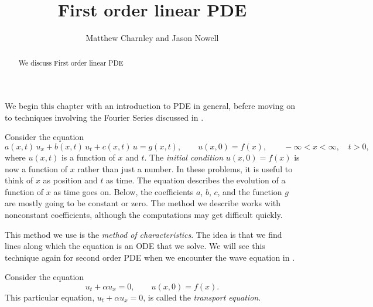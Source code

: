 \documentclass{ximera}
\title{First order linear PDE}
\author{Matthew Charnley and Jason Nowell}
\begin{document}
\begin{abstract}
    We discuss First order linear PDE
\end{abstract}
\maketitle

\label{fopde:section}



We begin this chapter with an introduction to PDE in general, befcre moving on to techniques involving the Fourier Series discussed in .

Consider the equation
\begin{equation*}
    a(x,t) \, u_x + b(x,t) \, u_t + c(x,t) \, u = g(x,t), \qquad u(x,0) = f(x) , \qquad -\infty < x < \infty, \quad t > 0 ,
\end{equation*}
where $u(x,t)$ is a function of $x$ and $t$. The \emph{initial condition} $u(x,0) = f(x)$ is now a function of $x$ rather than just a number. In these problems, it is useful to think of $x$ as position and $t$ as time. The equation describes the evolution of a function of $x$ as time goes on. Below, the coefficients $a$, $b$, $c$, and the function $g$ are mostly going to be constant or zero. The method we describe works with nonconstant coefficients, although the computations may get difficult quickly.

This method we use is the \emph{method of characteristics}. The idea is that we find lines along which the equation is an ODE that we solve. We will see this technique again for second order PDE when we encounter the wave equation in .

\begin{example}
    Consider the equation
    \begin{equation*}
        u_t + \alpha u_x = 0, \qquad u(x,0) = f(x) .
    \end{equation*}
    This particular equation, $u_t + \alpha u_x = 0$, is called the \emph{transport equation}.
\end{example}
\end{document}
